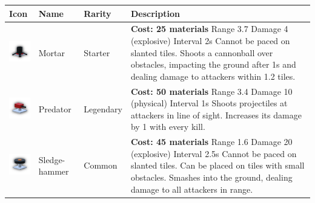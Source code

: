 \begin{table}[H]
    \centering
    \begin{tabular}{m{15mm}m{20mm}lm{}}
        \toprule
        \textbf{Icon}                                                      & \textbf{Name}  & \textbf{Rarity} & \textbf{Description}                                                                                                                                                                            \\
        \midrule
        \includegraphics[height=15mm]{img/Icons/Towers/Mortar.png}         & Mortar         & Starter         &
        \footnotesize{\textbf{Cost: 25 materials} \newline Range 3.7 \newline Damage 4 (explosive) \newline Interval 2s \newline Cannot be paced on slanted tiles. \newline Shoots a cannonball over obstacles, impacting the ground after 1s and dealing damage to attackers within 1.2 tiles.}                \\

        \includegraphics[height=15mm]{img/Icons/Towers/Predator.png}       & Predator       & Legendary       &
        \footnotesize{\textbf{Cost: 50 materials} \newline Range 3.4 \newline Damage 10 (physical) \newline Interval 1s \newline Shoots projectiles at attackers in line of sight. \newline Increases its damage by 1 with every kill.}                                                                         \\

        \includegraphics[height=15mm]{img/Icons/Towers/Sledgehammer.png}   & Sledge-hammer  & Common          &
        \footnotesize{\textbf{Cost: 45 materials} \newline Range 1.6 \newline Damage 20 (explosive) \newline Interval 2.5s \newline Cannot be paced on slanted tiles. \newline Can be placed on tiles with small obstacles. \newline Smashes into the ground, dealing damage to all attackers in range.}        \\


\end{tabular}
\end{table}
